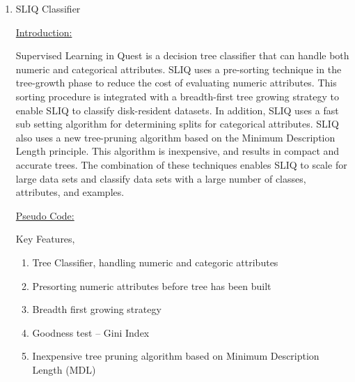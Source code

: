 \documentclass[12pt]{article}
\renewcommand{\_}{\kern-1.5pt\textunderscore\kern-1.5pt}
\begin{document}
\begin{enumerate}
	\item {\fontsize{20pt}{24.0pt}\selectfont SLIQ Classifier\par}\par

{\fontsize{14pt}{16.8pt}\selectfont \uline{Introduction:}\par}\par

Supervised Learning in Quest is a decision tree classifier that can handle both numeric and categorical attributes. SLIQ uses a pre-sorting technique in the tree-growth phase to reduce the cost of evaluating numeric attributes. This sorting procedure is integrated with a breadth-first tree growing strategy to enable SLIQ to classify disk-resident datasets. In addition, SLIQ uses a fast sub setting algorithm for determining splits for categorical attributes. SLIQ also uses a new tree-pruning algorithm based on the Minimum Description Length principle. This algorithm is inexpensive, and results in compact and accurate trees. The combination of these techniques enables SLIQ to scale for large data sets and classify data sets with a large number of classes, attributes, and examples.\par

{\fontsize{14pt}{16.8pt}\selectfont \uline{Pseudo Code:}\par}\par

Key Features,\par

\begin{enumerate}
	\item Tree Classifier, handling numeric and categoric attributes\par

	\item Presorting numeric attributes before tree has been built\par

	\item Breadth first growing strategy\par

	\item Goodness test – Gini Index\par

	\item Inexpensive tree pruning algorithm based on Minimum Description Length (MDL)
\end{enumerate}\par


\end{enumerate}
\end{document}
